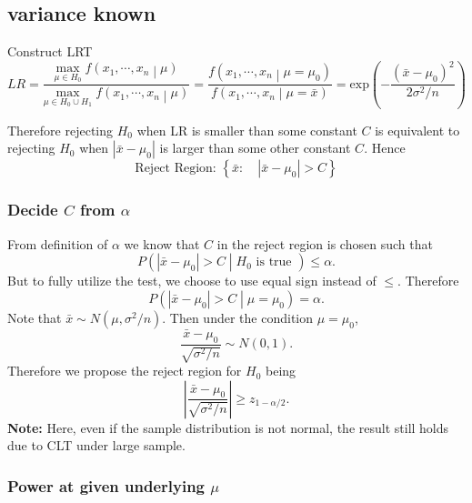 \documentclass[a4paper,12pt]{article}
\begin{document}
\subsection{variance known}
\label{sec:variance-known}

Construct LRT
\[
  LR = \frac{
    \underset{\mu\in H_0}{\mathrm{max}}\;
    f\left(x_1, \cdots, x_n\middle|\mu\right)
  }{
    \underset{\mu\in H_0\cup H_1}{\mathrm{max}}\;
    f\left(x_1, \cdots, x_n\middle|\mu\right)
  }
  =\frac{
    f\left(x_1, \cdots, x_n\middle|\mu = \mu_0\right)
  }{
    f\left(x_1, \cdots, x_n\middle|\mu = \bar{x}\right)
  }
  = \mathrm{exp}\left(
    -\frac{\left(\bar{x} - \mu_0\right)^2}{2\sigma^2 / n}
  \right)
\]

Therefore rejecting $H_0$ when LR is smaller than some constant $C$ is equivalent to rejecting $H_0$ when $\left|\bar{x} - \mu_0\right|$ is larger than some other constant $C$. Hence
\[
  \text{Reject Region: }
  \left\{
    \bar{x}
    :\quad
    \left|\bar{x}-\mu_0\right| > C
  \right\}
\]

\subsubsection{Decide $C$ from $\alpha$}
\label{sec:decide-c-from}

From definition of $\alpha$ we know that $C$ in the reject region is chosen such that
\[
  P\left(
    \left|\bar{x} - \mu_0\right| > C
    \middle| H_0\text{ is true }\right)
  \leq \alpha
  .
\]
But to fully utilize the test, we choose to use equal sign instead of $\leq$. Therefore
\[
  P\left(
    \left|\bar{x} - \mu_0\right| > C
    \middle| \mu = \mu_0
  \right)
  = \alpha
  .
\]
Note that $\bar{x}\sim N\left(\mu, \sigma^2 / n\right)$. Then under the condition $\mu = \mu_0$,
\[
  \frac{\bar{x} - \mu_0}{\sqrt{\sigma^2 / n}}
  \sim N\left(0, 1\right)
  .
\]
Therefore we propose the reject region for $H_0$ being
\[
  \left|
    \frac{\bar{x} - \mu_0}{\sqrt{\sigma^2 / n}}
  \right|
  \geq z_{1 - \alpha / 2}
  .
\]
\textbf{Note: } Here, even if the sample distribution is not normal, the result still holds due to CLT under large sample.

\subsubsection{Power at given underlying $\mu$}
\label{sec:power-at-given}
\end{document}
